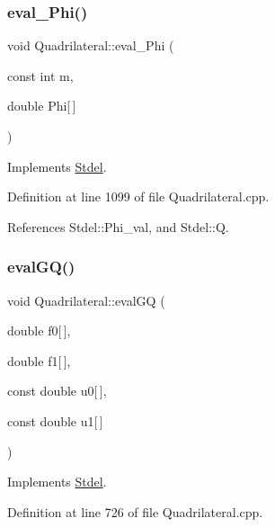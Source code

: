\subsubsection{\texorpdfstring{eval\+\_\+\+Phi()}{eval\_Phi()}}
{\footnotesize\ttfamily void Quadrilateral\+::eval\+\_\+\+Phi (\begin{DoxyParamCaption}\item[{const int}]{m,  }\item[{double}]{Phi\mbox{[}$\,$\mbox{]} }\end{DoxyParamCaption})\hspace{0.3cm}{\ttfamily [virtual]}}



Implements \hyperlink{classStdel_a2aa6ea12ceaa1fa4a7f63909ce41bc0b}{Stdel}.



Definition at line 1099 of file Quadrilateral.\+cpp.



References Stdel\+::\+Phi\+\_\+val, and Stdel\+::Q.

\mbox{\label{classQuadrilateral_a00983ee90b048f655b87943b9fa97ef9}} 
\subsubsection{\texorpdfstring{eval\+G\+Q()}{evalGQ()}\hspace{0.1cm}{\footnotesize\ttfamily [1/2]}}
{\footnotesize\ttfamily void Quadrilateral\+::eval\+GQ (\begin{DoxyParamCaption}\item[{double}]{f0\mbox{[}$\,$\mbox{]},  }\item[{double}]{f1\mbox{[}$\,$\mbox{]},  }\item[{const double}]{u0\mbox{[}$\,$\mbox{]},  }\item[{const double}]{u1\mbox{[}$\,$\mbox{]} }\end{DoxyParamCaption})\hspace{0.3cm}{\ttfamily [virtual]}}



Implements \hyperlink{classStdel_aac725224c4c3433228ca6841fe7aba49}{Stdel}.



Definition at line 726 of file Quadrilateral.\+cpp.



